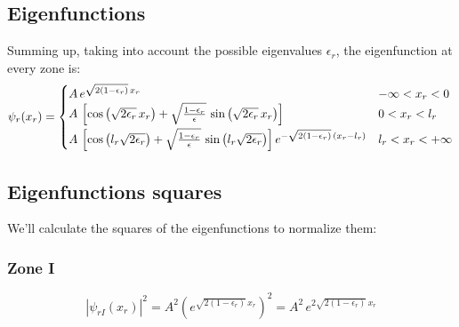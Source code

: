 \subsection{Eigenfunctions}
Summing up, taking into account the possible eigenvalues $\epsilon_r$, the
eigenfunction at every zone is:
\begin{equation}
\psi_r(x_r)=
\begin{cases}
A\,e^{\sqrt{2(1-\epsilon_r)}\,x_r}
& -\infty<x_r<0\\
A\,\left[\cos\left(\sqrt{2\epsilon_r}\,x_r\right)
  + \sqrt{\frac{1-\epsilon_r}{\epsilon}}\,
    \sin\left(\sqrt{2\epsilon_r}\,x_r\right)\right]
& 0<x_r<l_r\phantom{\rule[-9pt]{0em}{0em}}\\
A\,\left[\cos\left(l_r\sqrt{2\epsilon_r}\right)
  + \sqrt{\frac{1-\epsilon_r}{\epsilon}}\,
    \sin\left(l_r\sqrt{2\epsilon_r}\right)\right]
    e^{-\sqrt{2(1-\epsilon_r)}\,(x_r-l_r)}
& l_r<x_r<+\infty
\end{cases}
\end{equation}

\subsection{Eigenfunctions squares}
We'll calculate the squares of the eigenfunctions to normalize them:

\subsubsection{Zone I}
\[
\left|\psi_{rI}(x_r)\right|^2
= A^2\left(e^{\sqrt{2(1-\epsilon_r)}\,x_r}\right)^2
= A^2\,e^{2\sqrt{2(1-\epsilon_r)}\,x_r}
\]

